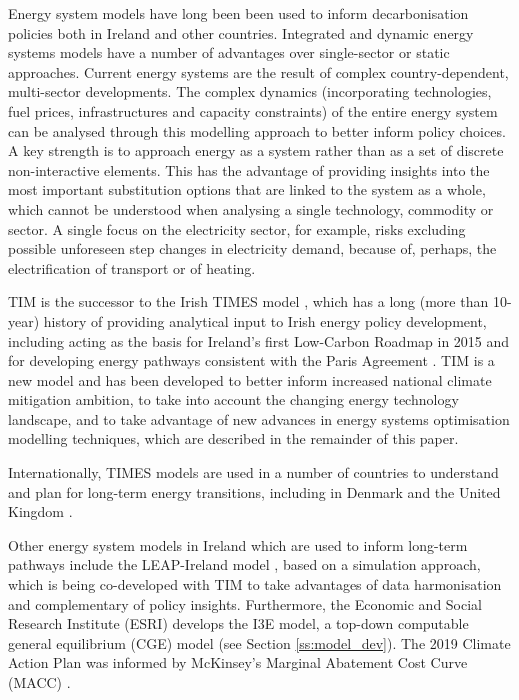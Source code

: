 \documentclass[journal abbreviation, manuscript]{copernicus}
\begin{document}
Energy system models have long been been used to inform decarbonisation policies both in Ireland and other countries. Integrated and dynamic energy systems models have a number of advantages over single-sector or static approaches. Current energy systems are the result of complex country-dependent, multi-sector developments. The complex dynamics (incorporating technologies, fuel prices, infrastructures and capacity constraints) of the entire energy system can be analysed through this modelling approach to better inform policy choices. A key strength is to approach energy as a system rather than as a set of discrete non-interactive elements. This has the advantage of providing insights into the most important substitution options that are linked to the system as a whole, which cannot be understood when analysing a single technology, commodity or sector. A single focus on the electricity sector, for example, risks excluding possible unforeseen step changes in electricity demand, because of, perhaps, the electrification of transport or of heating. 

TIM is the successor to the Irish TIMES model \citep{EnvironmentalProtectionAgency2020}, which has a long (more than 10-year) history of providing analytical input to Irish energy policy development, including acting as the basis for Ireland’s first Low-Carbon Roadmap in 2015 \citep{Deane2013} and for developing energy pathways consistent with the Paris Agreement \citep{Glynn2019}. TIM is a new model and has been developed to better inform increased national climate mitigation ambition, to take into account the changing energy technology landscape, and to take advantage of new advances in energy systems optimisation modelling techniques, which are described in the remainder of this paper.

Internationally, TIMES models are used in a number of countries to understand and plan for long-term energy transitions, including in Denmark \citep{Balyk2019} and the United Kingdom \citep{fais2016impact,daly2015indirect}. 

Other energy system models in Ireland which are used to inform long-term pathways include the LEAP-Ireland model \citep{MacUidhir2020,rogan2014leaps}, based on a simulation approach, which is being co-developed with TIM to take advantages of data harmonisation and complementary of policy insights. Furthermore, the Economic and Social Research Institute (ESRI) develops the I3E model, a top-down computable general equilibrium (CGE) model (see Section \ref{ss:model_dev}). The 2019 Climate Action Plan was informed by McKinsey's Marginal Abatement Cost Curve (MACC) \citep{DCCAE2019}. 
\end{document}
